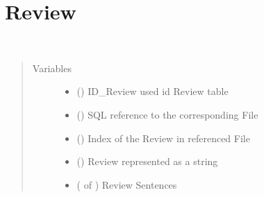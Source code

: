 \documentclass[letterpaper,10pt,english]{sphinxmanual}
\begin{document}
\section{Review}
\label{\detokenize{index:review}}

\begin{fulllineitems}
\label{\detokenize{index:loacore.classes.classes.Review}}~\begin{quote}\begin{description}
\item[{Variables}] \leavevmode\begin{itemize}
\item {} 
 () \textendash{} ID\_Review used id Review table

\item {} 
 () \textendash{} SQL reference to the corresponding File

\item {} 
 () \textendash{} Index of the Review in referenced File

\item {} 
 () \textendash{} Review represented as a string

\item {} 
 ( of {\hyperref[\detokenize{index:loacore.classes.classes.Sentence}]{}}) \textendash{} Review Sentences

\end{itemize}

\end{description}\end{quote}

\end{fulllineitems}
\end{document}

